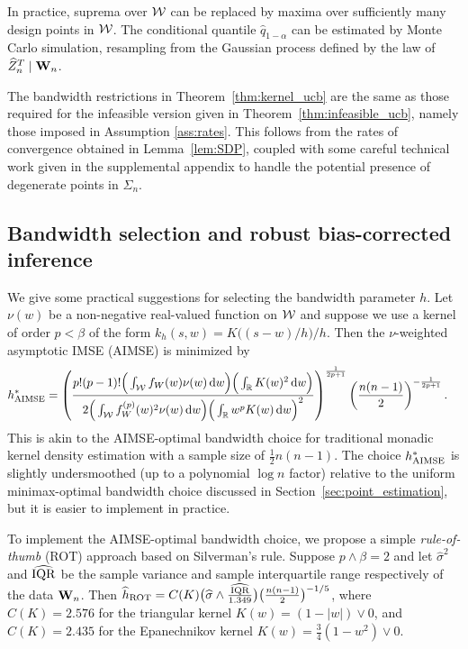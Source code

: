 In practice, suprema over $\mathcal{W}$ can be
replaced by maxima over sufficiently many design points in $\mathcal{W}$.
The conditional quantile $\widehat q_{1-\alpha}$
can be estimated by Monte Carlo simulation,
resampling from the Gaussian process defined by the law of
$\widehat Z_n^T \mid \mathbf{W}_n$.

The bandwidth restrictions in Theorem~\ref{thm:kernel_ucb} are the same
as those required for the infeasible version
given in Theorem~\ref{thm:infeasible_ucb}, namely those imposed in Assumption
\ref{ass:rates}. This follows from the rates of convergence obtained in
Lemma~\ref{lem:SDP}, coupled with some careful technical work given in the
supplemental appendix to handle the potential presence
of degenerate points in $\Sigma_n$.

\subsection{Bandwidth selection and robust bias-corrected inference}
\label{sec:bandwidth_selection}

We give some practical suggestions for selecting
the bandwidth parameter $h$.
Let $\nu(w)$ be a non-negative real-valued function on $\mathcal{W}$ and
suppose we use a kernel of order $p < \beta$
of the form $k_h(s,w) = K\big((s-w) / h\big)/h$.
Then the $\nu$-weighted asymptotic IMSE (AIMSE) is minimized by
%
\begin{align*}
  h^*_{\operatorname{AIMSE}}
  &=
  \left(
    \frac{
    p!(p-1)!
    \Big(\int_{\mathcal{W}} f_W(w) \nu(w) \,\mathrm{d}w\Big)
    \Big(\int_{\mathbb{R}} K(w)^2 \,\mathrm{d}w\Big)
    }
    {
    2
    \Big(
    \int_{\mathcal{W}}
    f_W^{(p)}(w)^2
    \nu(w)
    \,\mathrm{d}w
    \Big)
    \Big(
    \int_{\mathbb{R}}
    w^p K(w)
    \,\mathrm{d}w
    \Big)^2
    }
  \right)^{\frac{1}{2p+1}}
  \left(
    \frac{n(n-1)}{2}
  \right)^{-\frac{1}{2p+1}}.
\end{align*}
%
This is akin to the AIMSE-optimal bandwidth choice for traditional
monadic kernel density estimation
with a sample size of $\frac{1}{2}n(n-1)$.
The choice $h^*_{\operatorname{AIMSE}}$ is slightly undersmoothed
(up to a polynomial $\log n$ factor)
relative to the uniform minimax-optimal bandwidth choice discussed in
Section~\ref{sec:point_estimation}, but it is easier to implement in practice.

To implement the AIMSE-optimal bandwidth choice,
we propose a simple \emph{rule-of-thumb} (ROT)
approach based on Silverman's rule.
Suppose $p\wedge\beta=2$ and let $\widehat\sigma^2$ and $\widehat{\operatorname{IQR}}$
be the sample variance and sample interquartile range respectively
of the data $\mathbf{W}_n$. Then
$\widehat{h}_{\operatorname{ROT}} = C(K) \big( \widehat\sigma \wedge
\frac{\widehat{\operatorname{IQR}}}{1.349} \big) \big(\frac{n(n-1)}{2} \big)^{-1/5}$,
where $C(K)=2.576$ for the triangular kernel $K(w) = (1 - |w|) \vee 0$,
and $C(K)=2.435$ for the Epanechnikov kernel
$K(w) = \frac{3}{4}(1 - w^2) \vee 0$.

